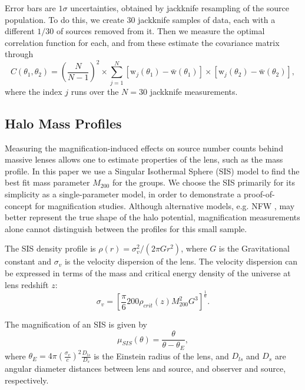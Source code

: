 Error bars are $1 \sigma$ uncertainties, obtained by jackknife resampling of the source population.  To do this, we create 30 jackknife samples of data, each with a different $1/30$ of sources removed from it.  Then we measure the optimal correlation function for each, and from these estimate the covariance matrix through
\begin{equation}
C(\theta_1, \theta_2)= \left( \frac{N}{N-1} \right)^2 \times \sum_{j=1}^N [\mathrm{w}_j(\theta_1)-\bar{\mathrm{w}}(\theta_1)] \times [\mathrm{w}_j(\theta_2)-\bar{\mathrm{w}}(\theta_2)],
\end{equation}
where the index $j$ runs over the $N=30$ jackknife measurements.

\subsection{Halo Mass Profiles}
Measuring the magnification-induced effects on source number counts behind massive lenses allows one to estimate properties of the lens, such as the mass profile.  In this paper we use a Singular Isothermal Sphere (SIS) model to find the best fit mass parameter $M_{200}$ for the groups. We choose the SIS primarily for its simplicity as a single-parameter model, in order to demonstrate a proof-of-concept for magnification studies.  Although alternative models, e.g. NFW \citep{nfw97}, may better represent the true shape of the halo potential, magnification measurements alone cannot distinguish between the profiles for this small sample.

The SIS density profile is $\rho(r)=\sigma_v^2/(2 \pi G r^2)$, where $G$ is the Gravitational constant and $\sigma_v$ is the velocity dispersion of the lens.  The velocity dispersion can be expressed in terms of the mass and critical energy density of the universe at lens redshift $z$:
\begin{equation}
\sigma_v=\left[ \frac{\pi}{6}200\rho_{crit}(z)M_{200}^2 G^3 \right]^\frac{1}{6} .
\end{equation}

The magnification of an SIS is given by 
\begin{equation}
\mu_{SIS}(\theta)=\frac{\theta}{\theta-\theta_E},
\end{equation}
where $\theta_E=4\pi(\frac{\sigma_v}{c})^2\frac{D_{ls}}{D_s}$ is the Einstein radius of the lens, and $D_{ls}$ and $D_s$ are angular diameter distances between lens and source, and observer and source, respectively.


